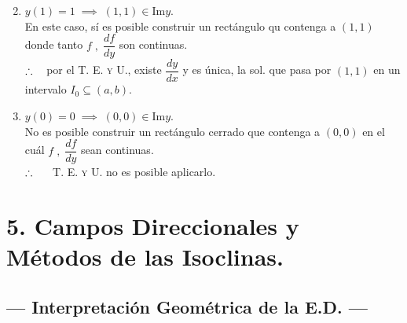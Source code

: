 \documentclass{beamer}
\begin{document}
\begin{frame}[t]
	\begin{exampleblock}{}
		\begin{enumerate}
				\setcounter{enumi}{1}
			\item \(y(1) =1 \;\implies\; (1,1) \in \mbox{Im} y\). \label{segundo} \\[2mm]
				En este caso, sí es posible construir un rectángulo qu contenga a \((1,1)\) donde tanto \(f \;,\; \dfrac{df}{dy}\) son continuas. \\[2mm]
				\(\therefore \hspace{3mm}\) por el \textsc{T. E. y U.}, existe \(\dfrac{dy}{dx}\) y es única, la sol. que pasa por \((1,1)\) en un intervalo \(I_0 \subseteq (a,b)\).
			\item \(y(0) =0 \;\implies\; (0,0) \in \mbox{Im} y\). \\[2mm]
				No es posible construir un rectángulo cerrado que contenga a \((0,0)\) en el cuál \(f \;,\; \dfrac{df}{dy}\) sean continuas. \\[2mm]
				\(\therefore \hspace{5mm}\) \textsc{T. E. y U.} no es posible aplicarlo.
		\end{enumerate}
	\end{exampleblock}
\end{frame}


\section{5. Campos Direccionales y Métodos de las Isoclinas.} %

\subsection{--- Interpretación Geométrica de la E.D. ---} %
\end{document}
